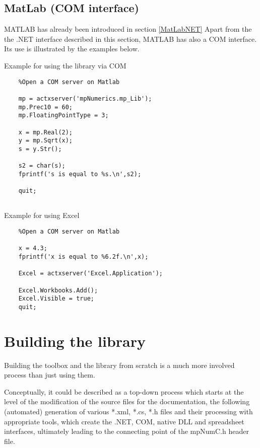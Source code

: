 	
	
	

	
	\newpage
	\section{MatLab (COM interface)}
	\label{MatLabCOM}
	
	MATLAB has already been introduced in section \ref{MatLabNET} Apart from the the .NET interface described in this section, MATLAB has also a COM interface. Its use is illustrated by the examples below.
	
	\vpara
	Example for using the library via COM
	
	\begin{lstlisting}
	%Open a COM server on Matlab
	
	mp = actxserver('mpNumerics.mp_Lib');
	mp.Prec10 = 60;
	mp.FloatingPointType = 3;
	
	x = mp.Real(2);
	y = mp.Sqrt(x);
	s = y.Str();
	
	s2 = char(s);
	fprintf('s is equal to %s.\n',s2);
	
	quit;
	
	\end{lstlisting}
	
	
	\vpara
	Example for using Excel
	
	\begin{lstlisting}
	%Open a COM server on Matlab
	
	x = 4.3;
	fprintf('x is equal to %6.2f.\n',x);
	
	Excel = actxserver('Excel.Application');
	
	Excel.Workbooks.Add();
	Excel.Visible = true;
	quit;
	\end{lstlisting}
	
	
	
	
	
	




\chapter{Building the library} 

Building the toolbox and the library from scratch is a much more involved process than just using them. 

Conceptually, it could be described as a top-down process which starts at the level of the modification of the source files for the documentation, the following (automated) generation of various *.xml, *.cs, *.h files and their processing with appropriate tools, which create the .NET, COM, native DLL and spreadsheet interfaces, ultimately leading to the connecting point of the mpNumC.h header file.

